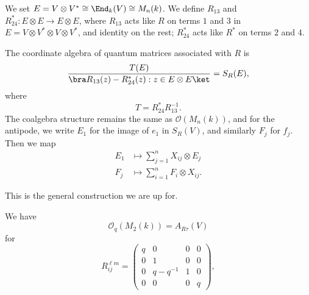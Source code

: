 \documentclass[a4paper]{article}
\begin{document}
We set $E = V \otimes V^* \cong \End_k(V) \cong M_n(k)$. We define $R_{13}$ and $R_{24}^*: E \otimes E \to E \otimes E$, where $R_{13}$ acts like $R$ on terms $1$ and $3$ in $E = V \otimes V^* \otimes V \otimes V^*$, and identity on the rest; $R_{24}^*$ acts like $R^*$ on terms $2$ and $4$.

\begin{defi}
  The coordinate algebra of quantum matrices associated with $R$ is
  \[
    \frac{T(E)}{ \bra R_{13}(z) - R_{24}^*(z): z \in E \otimes E\ket} = S_R(E),
  \]
  where
  \[
    T = R_{24}^* R_{13}^{-1}.
  \]
  The coalgebra structure remains the same as $\mathcal{O}(M_n(k))$, and for the antipode, we write $E_1$ for the image of $e_1$ in $S_R(V)$, and similarly $F_j$ for $f_j$. Then we map
  \begin{align*}
    E_1 &\mapsto \sum_{j = 1}^n X_{ij} \otimes E_j\\
    F_j &\mapsto \sum_{i = 1}^n F_i \otimes X_{ij}.
  \end{align*}
\end{defi}
This is the general construction we are up for.

\begin{eg}
  We have
  \[
    \mathcal{O}_q(M_2(k)) = A_{R\tau}(V)
  \]
  for
  \[
    R_{ij}^{\ell m} =
    \begin{pmatrix}
      q & 0 & 0 & 0\\
      0 & 1 & 0 & 0\\
      0 & q - q^{-1} & 1 & 0\\
      0 & 0 & 0 & q
    \end{pmatrix},
  \]
\end{eg}
\printindex
\end{document}
